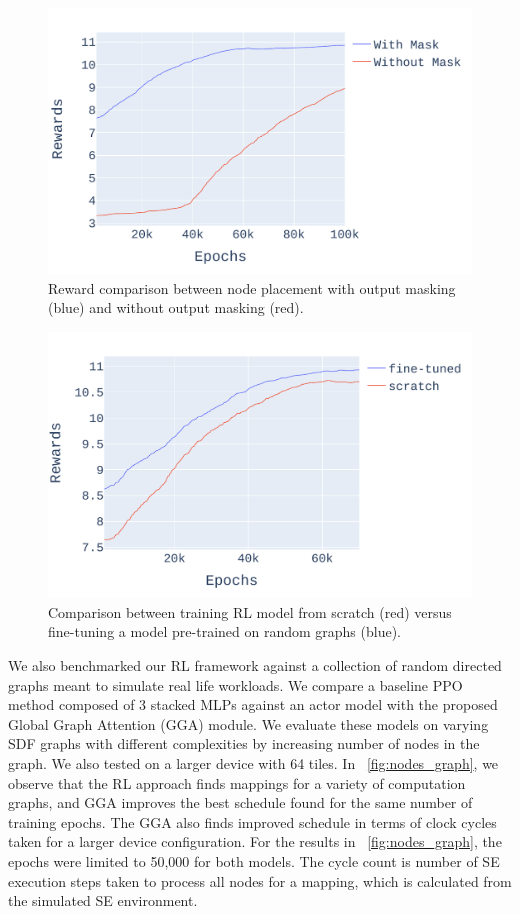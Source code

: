 \begin{figure}[tb]
  \centering
  \includegraphics[width=\linewidth]{fig/ifft_masked_nomask.pdf}
  \caption{Reward comparison between node placement with output masking (blue) and without output masking (red).}
  \label{fig:mask_nomask}
\end{figure}

\begin{figure}[tb]
  \centering
  \includegraphics[width=\linewidth]{fig/pretrain_ifft.pdf}
  \caption{Comparison between training RL model from scratch (red) versus fine-tuning a model pre-trained on random graphs (blue). }
  \label{fig:pretrain_ifft}
\end{figure}

We also benchmarked our RL framework against a collection of random directed graphs meant to simulate real life workloads. 
We compare a baseline PPO method composed of 3 stacked MLPs against an actor model with the proposed Global Graph Attention (GGA) module.
We evaluate these models on varying SDF graphs with different complexities by increasing number of nodes in the graph. 
We also tested on a larger device with 64 tiles.
In \figurename~\ref{fig:nodes_graph}, we observe that the RL approach finds mappings for a variety of computation graphs, and GGA
improves the best schedule found for the same number of training epochs. The GGA also finds improved schedule in terms of clock cycles taken for a larger device configuration. 
For the results in \figurename~\ref{fig:nodes_graph}, the epochs were limited to 50,000 for both models. 
The cycle count is number of SE execution steps taken to process all nodes for a mapping, which is calculated from the simulated SE environment. 

